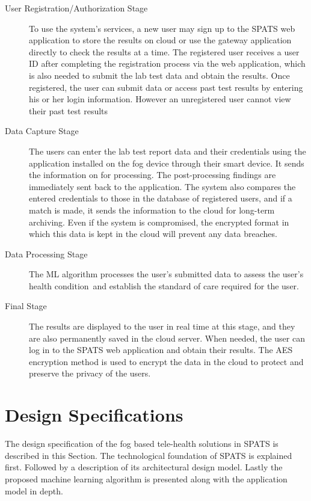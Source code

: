 \documentclass[10pt]{article}
\begin{document}
\begin{description}
\item[User Registration/Authorization Stage]
To use the system's services, a new user may sign up to the SPATS web application to store the results on cloud or use the gateway application directly to check the results at a time. The registered user receives a user ID after completing the registration process via the web application, which is also needed to submit the lab test data and obtain the results. Once registered, the user can submit data or access past test results by entering his or her login information. However an unregistered user cannot view their past test results

\item[Data Capture Stage]
The users can enter the lab test report data and their credentials using the application installed on the fog device through their smart device. It sends the information on for processing. The post-processing findings are immediately sent back to the application. The system also compares the entered credentials to those in the database of registered users, and if a match is made, it sends the information to the cloud for long-term archiving. Even if the system is compromised, the encrypted format in which this data is kept in the cloud will prevent any data breaches.

\item[Data Processing Stage]
The ML algorithm processes the user's submitted data to assess the user's health condition and establish the standard of care required for the user.

\item[Final Stage]
The results are displayed to the user in real time at this stage, and they are also permanently saved in the cloud server. When needed, the user can log in to the SPATS web application and obtain their results. The AES encryption method is used to encrypt the data in the cloud to protect and preserve the privacy of the users.


\end{description}

\section{Design Specifications} 

The design specification of the fog based tele-health solutions in SPATS is described in this Section. The technological foundation of SPATS is explained first. Followed by a description of its architectural design model. Lastly the proposed machine learning algorithm is presented along with the application model in depth.
\end{document}

